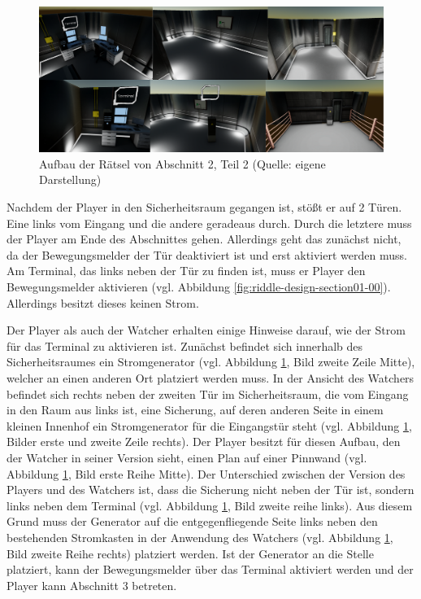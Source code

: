 \begin{figure}[ht]
\centering
\includegraphics[width=1\linewidth]{content/pictures/Rätseldesign - Abschnitt01 - Rätsel01.png}
\caption{Aufbau der Rätsel von Abschnitt 2, Teil 2 (Quelle: eigene Darstellung)}
\label{fig:riddle-design-section01-01}
\end{figure}

Nachdem der Player in den Sicherheitsraum gegangen ist, stößt er auf 2 Türen. Eine links vom Eingang und die andere geradeaus durch. Durch die letztere muss der Player am Ende des Abschnittes gehen. Allerdings geht das zunächst nicht, da der Bewegungsmelder der Tür deaktiviert ist und erst aktiviert werden muss. Am Terminal, das links neben der Tür zu finden ist, muss er Player den Bewegungsmelder aktivieren (vgl. Abbildung \ref{fig:riddle-design-section01-00}). Allerdings besitzt dieses keinen Strom. 

Der Player als auch der Watcher erhalten einige Hinweise darauf, wie der Strom für das Terminal zu aktivieren ist. Zunächst befindet sich innerhalb des Sicherheitsraumes ein Stromgenerator (vgl. Abbildung \ref{fig:riddle-design-section01-01}, Bild zweite Zeile Mitte), welcher an einen anderen Ort platziert werden muss. In der Ansicht des Watchers befindet sich rechts neben der zweiten Tür im Sicherheitsraum, die vom Eingang in den Raum aus links ist, eine Sicherung, auf deren anderen Seite in einem kleinen Innenhof ein Stromgenerator für die Eingangstür steht (vgl. Abbildung \ref{fig:riddle-design-section01-01}, Bilder erste und zweite Zeile rechts). Der Player besitzt für diesen Aufbau, den der Watcher in seiner Version sieht, einen Plan auf einer Pinnwand (vgl. Abbildung \ref{fig:riddle-design-section01-01}, Bild erste Reihe Mitte). Der Unterschied zwischen der Version des Players und des Watchers ist, dass die Sicherung nicht neben der Tür ist, sondern links neben dem Terminal (vgl. Abbildung \ref{fig:riddle-design-section01-01}, Bild zweite reihe links). Aus diesem Grund muss der Generator auf die entgegenfliegende Seite links neben den bestehenden Stromkasten in der Anwendung des Watchers (vgl. Abbildung \ref{fig:riddle-design-section01-01}, Bild zweite Reihe rechts) platziert werden. Ist der Generator an die Stelle platziert, kann der Bewegungsmelder über das Terminal aktiviert werden und der Player kann Abschnitt 3 betreten.

